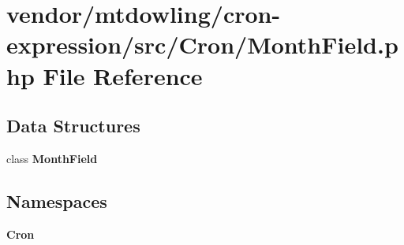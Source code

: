 \section{vendor/mtdowling/cron-\/expression/src/\+Cron/\+Month\+Field.php File Reference}
\label{_month_field_8php}
\subsection*{Data Structures}
\begin{DoxyCompactItemize}
\item 
class {\bf Month\+Field}
\end{DoxyCompactItemize}
\subsection*{Namespaces}
\begin{DoxyCompactItemize}
\item 
 {\bf Cron}
\end{DoxyCompactItemize}
